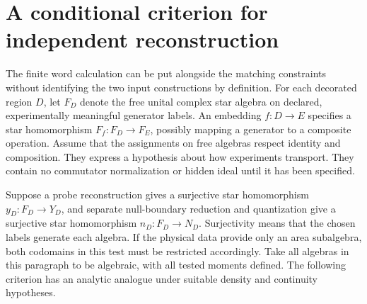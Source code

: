 \documentclass[11pt,letterpaper]{article}
\begin{document}
\section{A conditional criterion for independent reconstruction}
\label{sec:reconstruction}
The finite word calculation can be put alongside the matching
constraints without identifying the two input constructions by definition.
For each decorated region \(D\), let \(F_D\) denote the free unital
complex star algebra on declared, experimentally meaningful generator
labels. An embedding \(f:D\to E\) specifies a star homomorphism
\(F_f:F_D\to F_E\), possibly mapping a generator to a composite
operation. Assume that the assignments on free algebras respect identity
and composition. They express a hypothesis about how experiments
transport. They contain no commutator normalization or hidden ideal
until it has been specified.

Suppose a probe reconstruction gives a surjective star homomorphism
\(y_D:F_D\to Y_D\), and separate null-boundary reduction and
quantization give a surjective star homomorphism \(n_D:F_D\to N_D\).
Surjectivity means that the chosen labels generate each algebra. If the
physical data provide only an area subalgebra, both codomains in this test
must be restricted accordingly. Take all algebras in this paragraph to be
algebraic, with all tested moments defined. The following criterion has
an analytic analogue under suitable density and continuity hypotheses.
\end{document}
